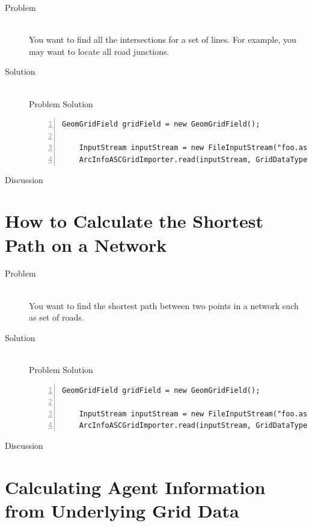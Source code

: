 \documentclass[twoside,10pt]{book}
\begin{document}
\begin{description}
\item[Problem]~\\
You want to find all the intersections for a set of lines.  For
example, you may want to locate all road junctions.

\item[Solution]~\\
Problem Solution
\begin{Verbatim}[frame=lines,framesep=5mm,numbers=left,commandchars=+\[\]]
	GeomGridField gridField = new GeomGridField();
	
	InputStream inputStream = new FileInputStream("foo.asc");
	ArcInfoASCGridImporter.read(inputStream, GridDataType.INTEGER, gridField);
\end{Verbatim}

\item[Discussion ]
\end{description}



\section{How to Calculate the Shortest Path on a Network}
\label{sec:shortestpaths}

\begin{description}
\item[Problem]~\\
You want to find the shortest path between two points in a network
such as set of roads.

\item[Solution]~\\
Problem Solution
\begin{Verbatim}[frame=lines,framesep=5mm,numbers=left,commandchars=+\[\]]
	GeomGridField gridField = new GeomGridField();
	
	InputStream inputStream = new FileInputStream("foo.asc");
	ArcInfoASCGridImporter.read(inputStream, GridDataType.INTEGER, gridField);
\end{Verbatim}

\item[Discussion ]
\end{description}




\section{Calculating Agent Information from Underlying Grid Data}
\label{sec:gridtoagentdata}
\end{document}
